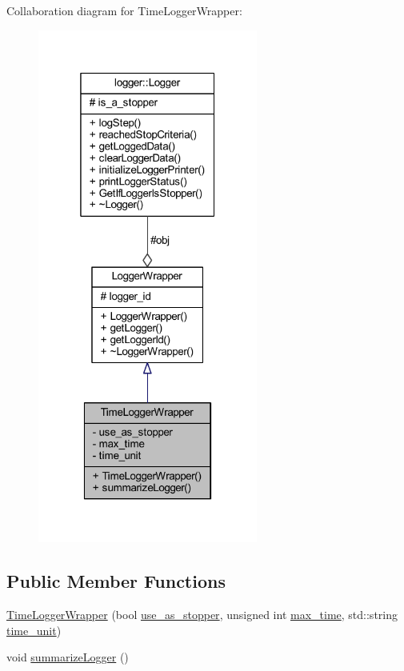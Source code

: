 Collaboration diagram for Time\+Logger\+Wrapper\+:\nopagebreak
\begin{figure}[H]
\begin{center}
\leavevmode
\includegraphics[width=205pt]{class_time_logger_wrapper__coll__graph}
\end{center}
\end{figure}
\subsection*{Public Member Functions}
\begin{DoxyCompactItemize}
\item 
\mbox{\hyperlink{class_time_logger_wrapper_a820564b1ee8a2944d3b73aef3a460d21}{Time\+Logger\+Wrapper}} (bool \mbox{\hyperlink{class_time_logger_wrapper_a00f5b655adb9bf054e6f0b8f7b8be225}{use\+\_\+as\+\_\+stopper}}, unsigned int \mbox{\hyperlink{class_time_logger_wrapper_a94de9106fdc84bc8b061bd9a76ec04d0}{max\+\_\+time}}, std\+::string \mbox{\hyperlink{class_time_logger_wrapper_a24bb4a8e236cc934bee6f811c0337dc9}{time\+\_\+unit}})
\item 
void \mbox{\hyperlink{class_time_logger_wrapper_a85e2772d6dbb9de70b3a99eb1f858c83}{summarize\+Logger}} ()
\end{DoxyCompactItemize}
